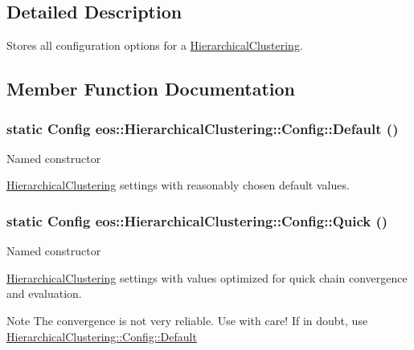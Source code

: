\subsection{Detailed Description}
Stores all configuration options for a \hyperlink{classeos_1_1HierarchicalClustering}{HierarchicalClustering}. 

\subsection{Member Function Documentation}
\hypertarget{classeos_1_1HierarchicalClustering_1_1Config_ab3a9f56ddac58bb2555732aca6826c55}{
\subsubsection[{Default}]{\setlength{\rightskip}{0pt plus 5cm}static {\bf Config} eos::HierarchicalClustering::Config::Default ()}}
\label{classeos_1_1HierarchicalClustering_1_1Config_ab3a9f56ddac58bb2555732aca6826c55}
Named constructor

\hyperlink{classeos_1_1HierarchicalClustering}{HierarchicalClustering} settings with reasonably chosen default values. \hypertarget{classeos_1_1HierarchicalClustering_1_1Config_a44043dd972ada7b67359a5e715d8555e}{
\subsubsection[{Quick}]{\setlength{\rightskip}{0pt plus 5cm}static {\bf Config} eos::HierarchicalClustering::Config::Quick ()}}
\label{classeos_1_1HierarchicalClustering_1_1Config_a44043dd972ada7b67359a5e715d8555e}
Named constructor

\hyperlink{classeos_1_1HierarchicalClustering}{HierarchicalClustering} settings with values optimized for quick chain convergence and evaluation.

\begin{DoxyNote}{Note}
The convergence is not very reliable. Use with care! If in doubt, use \hyperlink{classeos_1_1HierarchicalClustering_1_1Config_ab3a9f56ddac58bb2555732aca6826c55}{HierarchicalClustering::Config::Default} 
\end{DoxyNote}



